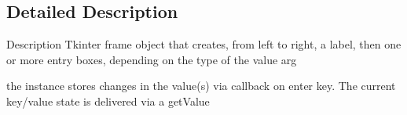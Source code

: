 \subsection{Detailed Description}
\begin{DoxyVerb}Description
Tkinter frame object that creates,
from left to right,
a label, then one or more entry boxes, 
depending on the type of the value arg

the instance stores changes in the value(s)
via callback on enter key.  The current
key/value state is delivered via a getValue
\end{DoxyVerb}
 
